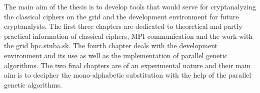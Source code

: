 The main aim of the thesis is to develop tools that would serve for cryptanalyzing the classical ciphers on the grid and the development environment for future cryptanalysts.
The first three chapters are dedicated to theoretical and partly practical information of classical ciphers, MPI communication and the work with the grid hpc.stuba.sk.
The fourth chapter deals with the development environment and its use as well as the implementation of parallel genetic algorithms.
The two final chapters are of an experimental nature and their main aim is to decipher the mono-alphabetic substitution with the help of the parallel genetic algorithms.
